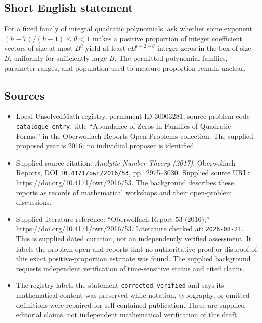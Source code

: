 \documentclass[11pt]{article}
\begin{document}
\subsection{Short English statement}
For a fixed family of integral quadratic polynomials, ask whether some exponent \((h-7)/(h-1)\leq\theta<1\) makes a positive proportion of integer coefficient vectors of size at most \(B^\theta\) yield at least \(cB^{t-2-\theta}\) integer zeros in the box of size \(B\), uniformly for sufficiently large \(B\). The permitted polynomial families, parameter ranges, and population used to measure proportion remain unclear.
\subsection{Sources}
\begin{itemize}
\item Local UnsolvedMath registry, permanent ID \(30003281\), source problem code \texttt{catalogue entry}, title ``Abundance of Zeros in Families of Quadratic Forms,'' in the Oberwolfach Reports Open Problems collection. The supplied proposed year is 2016; no individual proposer is identified.
\item Supplied source citation: \emph{Analytic Number Theory (2017)}, Oberwolfach Reports, DOI \texttt{10.4171/owr/2016/53}, pp.\ 2975--3030. Supplied source URL: \url{https://doi.org/10.4171/owr/2016/53}. The background describes these reports as records of mathematical workshops and their open-problem discussions.
\item Supplied literature reference: ``Oberwolfach Report 53 (2016),'' \url{https://doi.org/10.4171/owr/2016/53}. Literature checked at: \texttt{2026-08-21}. This is supplied dated curation, not an independently verified assessment. It labels the problem open and reports that no authoritative proof or disproof of this exact positive-proportion estimate was found. The supplied background requests independent verification of time-sensitive status and cited claims.
\item The registry labels the statement \texttt{corrected\_verified} and says its mathematical content was preserved while notation, typography, or omitted definitions were repaired for self-contained publication. These are supplied editorial claims, not independent mathematical verification of this draft.
\end{itemize}
\end{document}
